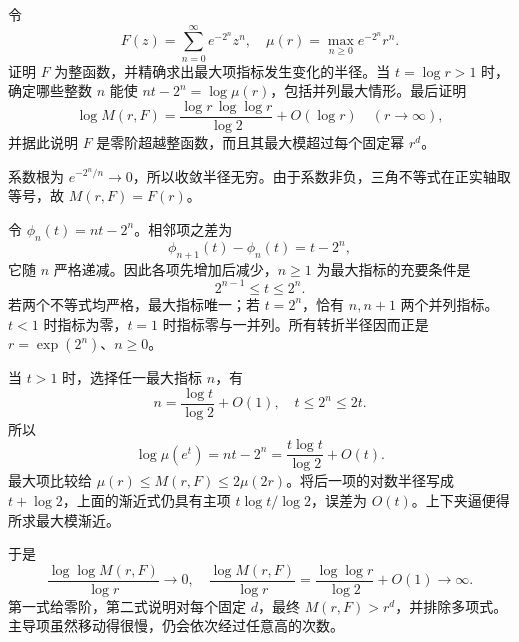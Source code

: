 \begin{exercise}[最大项的转折与零阶增长]\label{b3:ex:19-draft-03}
令
\[
 F(z)=\sum_{n=0}^\infty e^{-2^n}z^n,\quad
 \mu(r)=\max_{n\ge0}e^{-2^n}r^n.
\]
证明 \(F\) 为整函数，并精确求出最大项指标发生变化的半径。当 \(t=\log r>1\) 时，确定哪些整数 \(n\) 能使 \(nt-2^n=\log\mu(r)\)，包括并列最大情形。最后证明
\[
 \log M(r,F)=\frac{\log r\,\log\log r}{\log2}+O(\log r)
 \quad(r\to\infty),
\]
并据此说明 \(F\) 是零阶超越整函数，而且其最大模超过每个固定幂 \(r^d\)。
\end{exercise}
\begin{solution}
系数根为 \(e^{-2^n/n}\to0\)，所以收敛半径无穷。由于系数非负，三角不等式在正实轴取等号，故 \(M(r,F)=F(r)\)。

令 \(\phi_n(t)=nt-2^n\)。相邻项之差为
\[
 \phi_{n+1}(t)-\phi_n(t)=t-2^n,
\]
它随 \(n\) 严格递减。因此各项先增加后减少，\(n\ge1\) 为最大指标的充要条件是
\[
 2^{n-1}\le t\le2^n.
\]
若两个不等式均严格，最大指标唯一；若 \(t=2^n\)，恰有 \(n,n+1\) 两个并列指标。\(t<1\) 时指标为零，\(t=1\) 时指标零与一并列。所有转折半径因而正是
\(r=\exp(2^n)\)、\(n\ge0\)。

当 \(t>1\) 时，选择任一最大指标 \(n\)，有
\[
 n=\frac{\log t}{\log2}+O(1),\quad t\le2^n\le2t.
\]
所以
\[
 \log\mu(e^t)=nt-2^n=\frac{t\log t}{\log2}+O(t).
\]
最大项比较给
\(\mu(r)\le M(r,F)\le2\mu(2r)\)。将后一项的对数半径写成 \(t+\log2\)，上面的渐近式仍具有主项 \(t\log t/\log2\)，误差为 \(O(t)\)。上下夹逼便得所求最大模渐近。

于是
\[
 \frac{\log\log M(r,F)}{\log r}\longrightarrow0,
 \quad
 \frac{\log M(r,F)}{\log r}
 =\frac{\log\log r}{\log2}+O(1)\longrightarrow\infty.
\]
第一式给零阶，第二式说明对每个固定 \(d\)，最终 \(M(r,F)>r^d\)，并排除多项式。主导项虽然移动得很慢，仍会依次经过任意高的次数。
\end{solution}

